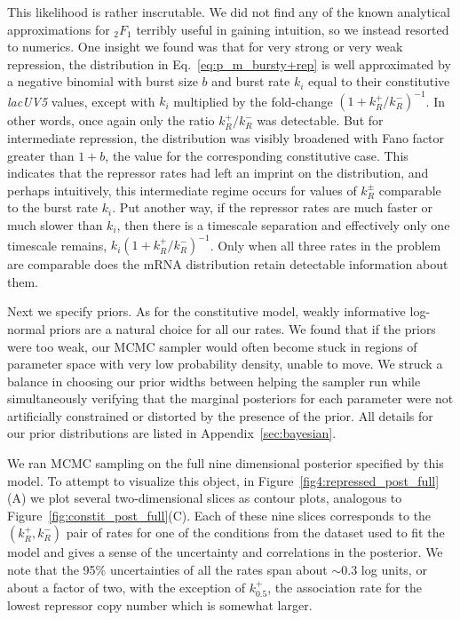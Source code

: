This likelihood is rather inscrutable. We did not find any of the known
analytical approximations for ${_2F_1}$ terribly useful in gaining intuition, so
we instead resorted to numerics. One insight we found
was that for very strong or very weak repression, the distribution in
Eq.~\ref{eq:p_m_bursty+rep} is well approximated by a negative binomial with
burst size $b$ and burst rate $k_i$ equal to their constitutive \textit{lacUV5}
values, except with $k_i$ multiplied by the fold-change
$\left(1+k_R^+/k_R^-\right)^{-1}$. In other words, once again only the ratio
$k_R^+/k_R^-$ was detectable. But for intermediate repression, the distribution
was visibly broadened with Fano factor greater than $1+b$, the value for the
corresponding constitutive case. This indicates that the repressor rates had
left an imprint on the distribution, and perhaps intuitively, this intermediate
regime occurs for values of $k_R^\pm$ comparable to the burst rate $k_i$. Put
another way, if the repressor rates are much faster or much slower than $k_i$,
then there is a timescale separation and effectively only one timescale remains,
$k_i\left(1+k_R^+/k_R^-\right)^{-1}$. Only when all three rates in the problem
are comparable does the mRNA distribution retain detectable information about
them.

Next we specify priors. As for the constitutive model, weakly informative
log-normal priors are a natural choice for all our rates. We found that if the
priors were too weak, our MCMC sampler would often become stuck in regions of
parameter space with very low probability density, unable to move. We struck a
balance in choosing our prior widths between helping the sampler run while
simultaneously verifying that the marginal posteriors for each parameter were
not artificially constrained or distorted by the presence of the prior.
All details for our prior distributions are listed in 
Appendix~\ref{sec:bayesian}.

We ran MCMC sampling on the full nine dimensional posterior specified by this
model. To attempt to visualize this object, in
Figure~\ref{fig4:repressed_post_full}(A) we plot several two-dimensional slices
as contour plots, analogous to Figure~\ref{fig:constit_post_full}(C). Each of
these nine slices corresponds to the $(k_R^+, k_R^-)$ pair of rates for one of
the conditions from the dataset used to fit the model and gives a
sense of the uncertainty and correlations in the posterior.
We note that the 95\% uncertainties of all the rates span about $\sim0.3$
log units, or about a factor of two, with the exception of $k_{0.5}^+$, the
association rate for the lowest repressor copy number which is somewhat larger.

